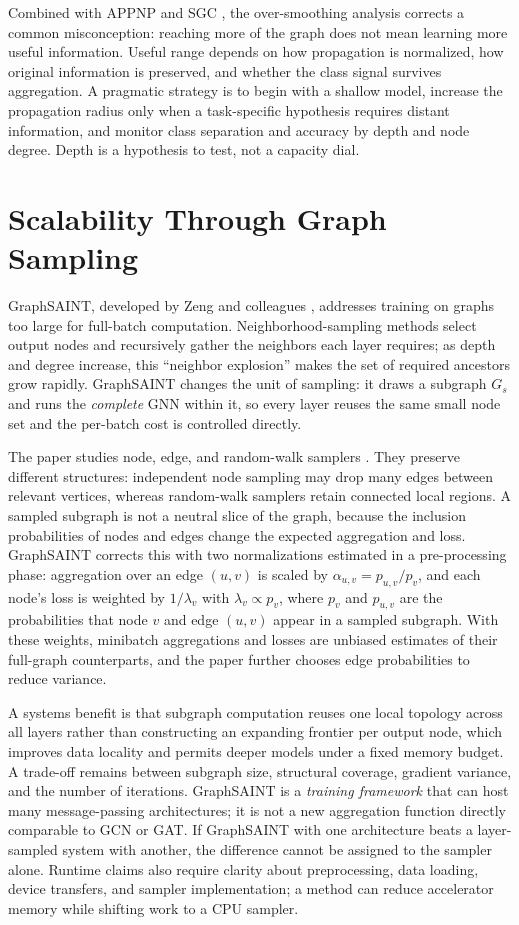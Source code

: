 \documentclass[conference]{IEEEtran}
\begin{document}
Combined with APPNP \cite{b6} and SGC \cite{b5}, the over-smoothing analysis corrects a common misconception: reaching more of the graph does not mean learning more useful information. Useful range depends on how propagation is normalized, how original information is preserved, and whether the class signal survives aggregation. A pragmatic strategy is to begin with a shallow model, increase the propagation radius only when a task-specific hypothesis requires distant information, and monitor class separation and accuracy by depth and node degree. Depth is a hypothesis to test, not a capacity dial.

\section{Scalability Through Graph Sampling}

GraphSAINT, developed by Zeng and colleagues \cite{b8}, addresses training on graphs too large for full-batch computation. Neighborhood-sampling methods select output nodes and recursively gather the neighbors each layer requires; as depth and degree increase, this ``neighbor explosion'' makes the set of required ancestors grow rapidly. GraphSAINT changes the unit of sampling: it draws a subgraph \(G_s\) and runs the \emph{complete} GNN within it, so every layer reuses the same small node set and the per-batch cost is controlled directly.

The paper studies node, edge, and random-walk samplers \cite{b8}. They preserve different structures: independent node sampling may drop many edges between relevant vertices, whereas random-walk samplers retain connected local regions. A sampled subgraph is not a neutral slice of the graph, because the inclusion probabilities of nodes and edges change the expected aggregation and loss. GraphSAINT corrects this with two normalizations estimated in a pre-processing phase: aggregation over an edge \((u,v)\) is scaled by \(\alpha_{u,v}=p_{u,v}/p_v\), and each node's loss is weighted by \(1/\lambda_v\) with \(\lambda_v\propto p_v\), where \(p_v\) and \(p_{u,v}\) are the probabilities that node \(v\) and edge \((u,v)\) appear in a sampled subgraph. With these weights, minibatch aggregations and losses are unbiased estimates of their full-graph counterparts, and the paper further chooses edge probabilities to reduce variance.

A systems benefit is that subgraph computation reuses one local topology across all layers rather than constructing an expanding frontier per output node, which improves data locality and permits deeper models under a fixed memory budget. A trade-off remains between subgraph size, structural coverage, gradient variance, and the number of iterations. GraphSAINT is a \emph{training framework} that can host many message-passing architectures; it is not a new aggregation function directly comparable to GCN or GAT. If GraphSAINT with one architecture beats a layer-sampled system with another, the difference cannot be assigned to the sampler alone. Runtime claims also require clarity about preprocessing, data loading, device transfers, and sampler implementation; a method can reduce accelerator memory while shifting work to a CPU sampler.
\end{document}
